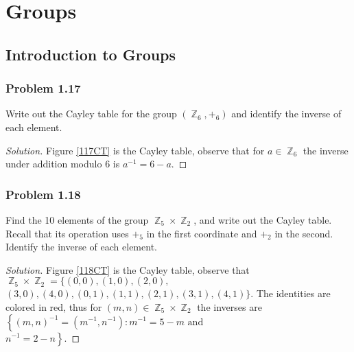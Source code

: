 \documentclass{amsbook}
\DeclareMathOperator{\Z}{\mathbb{Z}}
\begin{document}
	\mainmatter

	\chapter{Groups}
	\label{sec:groups}
		\section{Introduction to Groups}
		\label{sec:introduction_to_groups}
			\subsection*{Problem 1.17}
			\label{sub:problem_1_17}
			Write out the Cayley table for the group $(\Z_{6}, +_{6})$ and identify the inverse of each element.
			\begin{proof}[Solution] Figure \ref{117CT} is the Cayley table, observe that for $a \in \Z_{6}$ the inverse under addition modulo 6 is $a^{-1} = 6 - a$.
			\end{proof}

			\subsection*{Problem 1.18}
			\label{sub:problem_1_18}
			Find the 10 elements of the group $\Z_{5} \times \Z_{2}$, and write out the Cayley table. 
			Recall that its operation uses $+_{5}$ in the first coordinate and $+_{2}$ in the second. 
			Identify the inverse of each element.
			\begin{proof}[Solution] Figure \ref{118CT} is the Cayley table, observe that $\Z_{5} \times \Z_{2} = \{ (0,0), (1,0), (2,0),$ \\ 
			$(3,0), (4,0), (0,1), (1,1), (2,1), (3,1), (4,1) \}$.
			The identities are colored in red, thus for $(m,n) \in \Z_{5}\times\Z_{2}$ the inverses are $\left\{(m,n)^{-1} = \left( m^{-1} , n^{-1} \right) : m^{-1} = 5 - m \text{ and } \right.$\\ 
			$ \left. n^{-1} = 2 - n\right\}$.
			\end{proof}
\end{document}
